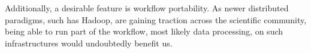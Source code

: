 Additionally, a desirable feature is workflow portability. As newer distributed
paradigms, such has Hadoop, are gaining traction across the scientific community,
being able to run part of the workflow, most likely data processing, on such
infrastructures would undoubtedly benefit us.





